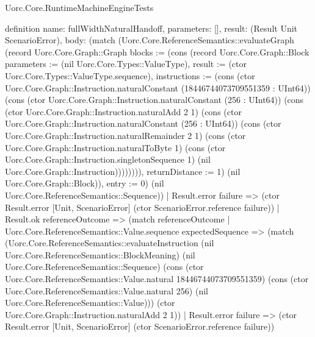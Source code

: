 \begin{lexlean}{Uorc.Core.RuntimeMachineEngineTests}
\begin{semanticmodule}
definition{
  name: fullWidthNaturalHandoff,
  parameters: [],
  result: (Result Unit ScenarioError),
  body: (match (Uorc.Core.ReferenceSemantics::evaluateGraph (record Uorc.Core.Graph::Graph {blocks := (cons (record Uorc.Core.Graph::Block {parameters := (nil Uorc.Core.Types::ValueType), result := (ctor Uorc.Core.Types::ValueType.sequence), instructions := (cons (ctor Uorc.Core.Graph::Instruction.naturalConstant (18446744073709551359 : UInt64)) (cons (ctor Uorc.Core.Graph::Instruction.naturalConstant (256 : UInt64)) (cons (ctor Uorc.Core.Graph::Instruction.naturalAdd 2 1) (cons (ctor Uorc.Core.Graph::Instruction.naturalConstant (256 : UInt64)) (cons (ctor Uorc.Core.Graph::Instruction.naturalRemainder 2 1) (cons (ctor Uorc.Core.Graph::Instruction.naturalToByte 1) (cons (ctor Uorc.Core.Graph::Instruction.singletonSequence 1) (nil Uorc.Core.Graph::Instruction)))))))), returnDistance := 1}) (nil Uorc.Core.Graph::Block)), entry := 0}) (nil Uorc.Core.ReferenceSemantics::Sequence))
    | Result.error failure => (ctor Result.error [Unit, ScenarioError] (ctor ScenarioError.reference failure))
    | Result.ok referenceOutcome => (match referenceOutcome
      | Uorc.Core.ReferenceSemantics::Value.sequence expectedSequence => (match (Uorc.Core.ReferenceSemantics::evaluateInstruction (nil Uorc.Core.ReferenceSemantics::BlockMeaning) (nil Uorc.Core.ReferenceSemantics::Sequence) (cons (ctor Uorc.Core.ReferenceSemantics::Value.natural 18446744073709551359) (cons (ctor Uorc.Core.ReferenceSemantics::Value.natural 256) (nil Uorc.Core.ReferenceSemantics::Value))) (ctor Uorc.Core.Graph::Instruction.naturalAdd 2 1))
        | Result.error failure => (ctor Result.error [Unit, ScenarioError] (ctor ScenarioError.reference failure))
}
\end{semanticmodule}
\end{lexlean}
